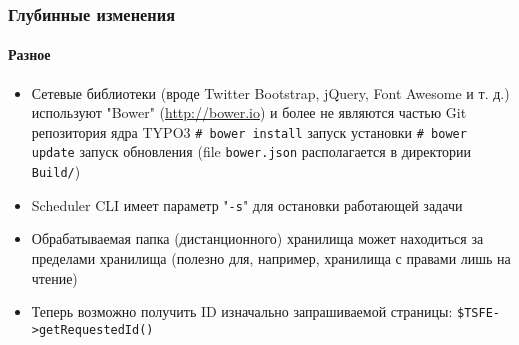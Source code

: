\begin{frame}[fragile]
	\frametitle{Глубинные изменения}
	\framesubtitle{Разное}

	\begin{itemize}

		\item Сетевые библиотеки (вроде Twitter Bootstrap, jQuery, Font Awesome и т. д.) используют
			"Bower" (\url{http://bower.io}) и более не являются частью Git репозитория ядра TYPO3\newline
			\small
				\texttt{\# bower install}	\tabto{3.4cm}запуск установки\newline
				\texttt{\# bower update}		\tabto{3.4cm}запуск обновления\newline
			\normalsize
			(file \texttt{bower.json} располагается в директории \texttt{Build/})

		\item Scheduler CLI имеет параметр "\texttt{-s}" для остановки работающей задачи

		\item Обрабатываемая папка (дистанционного) хранилища может находиться за пределами хранилища
			(полезно для, например, хранилища с правами лишь на чтение)

		\item Теперь возможно получить ID изначально запрашиваемой страницы:
			\texttt{\$TSFE->getRequestedId()}

	\end{itemize}

\end{frame}

